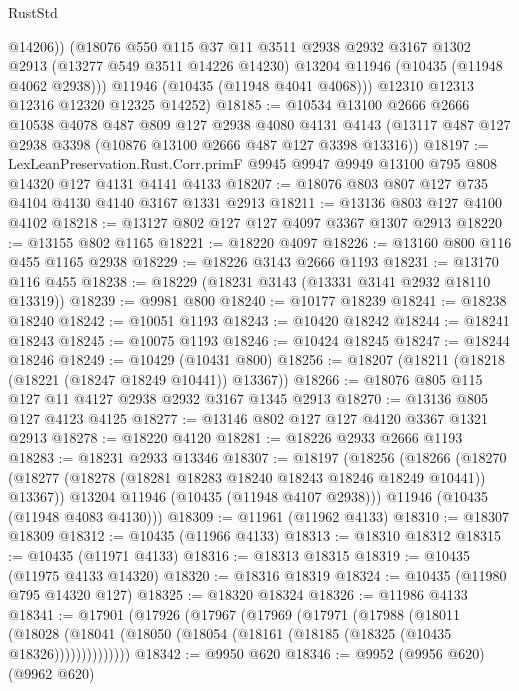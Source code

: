 \begin{lexlean}{RustStd}
\begin{coremodule}
            @14206))
        (@18076
          @550
          @115
          @37
          @11
          @3511
          @2938
          @2932
          @3167
          @1302
          @2913
          (@13277 @549 @3511 @14226 @14230)
          @13204
          @11946
          (@10435 (@11948 @4062 @2938)))
        @11946
        (@10435 (@11948 @4041 @4068)))
      @12310
      @12313
      @12316
      @12320
      @12325
      @14252)
@18185 := @10534
    @13100
    @2666
    @2666
    @10538
    @4078
    @487
    @809
    @127
    @2938
    @4080
    @4131
    @4143
    (@13117 @487 @127 @2938 @3398 (@10876 @13100 @2666 @487 @127 @3398 @13316))
@18197 := LexLeanPreservation.Rust.Corr.primF
    @9945
    @9947
    @9949
    @13100
    @795
    @808
    @14320
    @127
    @4131
    @4141
    @4133
@18207 := @18076 @803 @807 @127 @735 @4104 @4130 @4140 @3167 @1331 @2913
@18211 := @13136 @803 @127 @4100 @4102
@18218 := @13127 @802 @127 @127 @4097 @3367 @1307 @2913
@18220 := @13155 @802 @1165
@18221 := @18220 @4097
@18226 := @13160 @800 @116 @455 @1165 @2938
@18229 := @18226 @3143 @2666 @1193
@18231 := @13170 @116 @455
@18238 := @18229 (@18231 @3143 (@13331 @3141 @2932 @18110 @13319))
@18239 := @9981 @800
@18240 := @10177 @18239
@18241 := @18238 @18240
@18242 := @10051 @1193
@18243 := @10420 @18242
@18244 := @18241 @18243
@18245 := @10075 @1193
@18246 := @10424 @18245
@18247 := @18244 @18246
@18249 := @10429 (@10431 @800)
@18256 := @18207 (@18211 (@18218 (@18221 (@18247 @18249 @10441)) @13367))
@18266 := @18076 @805 @115 @127 @11 @4127 @2938 @2932 @3167 @1345 @2913
@18270 := @13136 @805 @127 @4123 @4125
@18277 := @13146 @802 @127 @127 @4120 @3367 @1321 @2913
@18278 := @18220 @4120
@18281 := @18226 @2933 @2666 @1193
@18283 := @18231 @2933 @13346
@18307 := @18197
    (@18256
      (@18266
        (@18270 (@18277 (@18278 (@18281 @18283 @18240 @18243 @18246 @18249 @10441)) @13367))
        @13204
        @11946
        (@10435 (@11948 @4107 @2938)))
      @11946
      (@10435 (@11948 @4083 @4130)))
@18309 := @11961 (@11962 @4133)
@18310 := @18307 @18309
@18312 := @10435 (@11966 @4133)
@18313 := @18310 @18312
@18315 := @10435 (@11971 @4133)
@18316 := @18313 @18315
@18319 := @10435 (@11975 @4133 @14320)
@18320 := @18316 @18319
@18324 := @10435 (@11980 @795 @14320 @127)
@18325 := @18320 @18324
@18326 := @11986 @4133
@18341 := @17901
    (@17926
      (@17967
        (@17969
          (@17971
            (@17988
              (@18011
                (@18028 (@18041 (@18050 (@18054 (@18161 (@18185 (@18325 (@10435 @18326))))))))))))))
@18342 := @9950 @620
@18346 := @9952 (@9956 @620) (@9962 @620)

\end{coremodule}
\end{lexlean}
